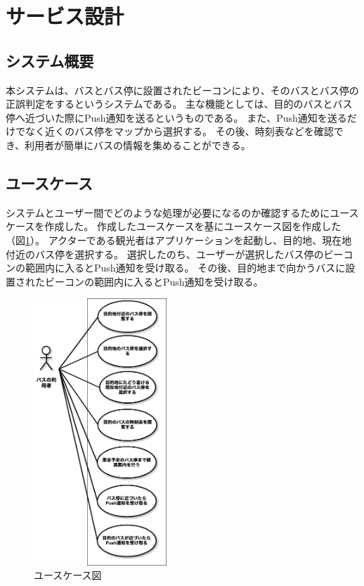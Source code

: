 \documentclass[openany,11pt,papersize]{jsbook}
\begin{document}


\section{サービス設計}

\subsection{システム概要}
本システムは、バスとバス停に設置されたビーコンにより、そのバスとバス停の正誤判定をするというシステムである。
主な機能としては、目的のバスとバス停へ近づいた際にPush通知を送るというものである。
また、Push通知を送るだけでなく近くのバス停をマップから選択する。
その後、時刻表などを確認でき、利用者が簡単にバスの情報を集めることができる。


\subsection{ユースケース}
システムとユーザー間でどのような処理が必要になるのか確認するためにユースケースを作成した。
作成したユースケースを基にユースケース図を作成した（図\ref{fig:usecase}）。
アクターである観光者はアプリケーションを起動し、目的地、現在地付近のバス停を選択する。
選択したのち、ユーザーが選択したバス停のビーコンの範囲内に入るとPush通知を受け取る。
その後、目的地まで向かうバスに設置されたビーコンの範囲内に入るとPush通知を受け取る。

\begin{figure}[htbp]
  \begin{center}
    \includegraphics[clip,width=5.0cm]{img/usecase.png}
    \caption{ユースケース図}
    \label{fig:usecase}
  \end{center}
\end{figure}
\end{document}
